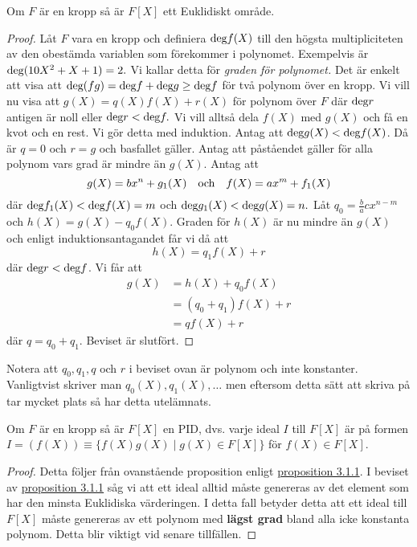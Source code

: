 \documentclass{article}
\newcommand{\grad}[0]{\textnormal{deg}}
\theoremstyle{definition}
\begin{document}
\begin{myprop}{}{}
  Om $F$ är en kropp så är $F[X]$ ett Euklidiskt område. 
\end{myprop}
\begin{proof}
  Låt $F$ vara en kropp och definiera $\grad f(X)$ till den högsta multipliciteten av den obestämda variablen som förekommer i polynomet. Exempelvis är 
  $\grad (10X^2 + X + 1) = 2.$ Vi kallar detta för \textit{graden för polynomet.} Det är enkelt att visa att 
  $\grad (fg) = \grad f + \grad g \geq \grad f$ för två polynom över en kropp. Vi vill nu visa att $g(X) = q(X)f(X) + r(X)$ för polynom över $F$
  där $\grad r$ antigen är noll eller $\grad r < \grad f.$ Vi vill alltså dela $f(X)$ med $g(X)$ och få en kvot och en rest. Vi gör detta med 
  induktion. Antag att $\grad g(X) < \grad f(X)$. Då är $q = 0$ och $r = g$ och basfallet gäller. Antag att påståendet gäller för alla 
  polynom vars grad är mindre än $g(X)$. Antag att 
  \[g(X) = bx^n + g_1(X) \quad \textnormal{och} \quad f(X) = ax^m + f_1(X)\]
  där $\grad f_1(X) < \grad f(X) = m$ och $\grad g_1(X) < \grad g(X) = n.$ Låt $q_0 = \frac{b}{a} cx^{n-m}$ och $h(X) = g(X) - q_0f(X)$. 
  Graden för $h(X)$ är nu mindre än $g(X)$ och enligt induktionsantagandet får vi då att 
  \[h(X) = q_1f(X) + r\]
  där $\grad r < \grad f$. Vi får att 
  \begin{align*}
    g(X) &= h(X) + q_0f(X) \\
    &= (q_0 + q_1)f(X) + r \\
    &= qf(X) + r
  \end{align*}
  där $q = q_0 + q_1.$ Beviset är slutfört.
\end{proof}
Notera att $q_0, q_1, q$ och $r$ i beviset ovan är polynom och inte konstanter. Vanligtvist skriver man $q_0(X), q_1(X), \ldots$ 
men eftersom detta sätt att skriva på tar mycket plats så har detta utelämnats.

\hypertarget{pid}{}
\begin{myprop}{}{}
  Om $F$ är en kropp så är $F[X]$ en PID, dvs. varje ideal $I$ till $F[X]$ är på formen 
  $I = (f(X)) \equiv \{f(X)g(X) \; | \; g(X) \in F[X]\}$ för $f(X) \in F[X].$
\end{myprop}
\begin{proof}
  Detta följer från ovanstående proposition enligt 
  \hyperlink{eukpid}{proposition 3.1.1}.
  I beviset av \hyperlink{eukpid}{proposition 3.1.1} såg vi att ett ideal alltid måste genereras av det element som har den 
  minsta Euklidiska värderingen. I detta fall betyder detta att ett ideal till $F[X]$ måste genereras av ett polynom med \textbf{lägst grad} bland 
  alla icke konstanta polynom. Detta blir viktigt vid senare tillfällen.
\end{proof}
\end{document}
